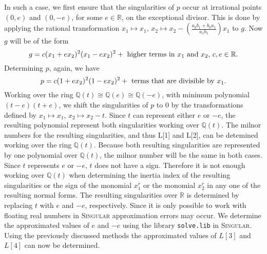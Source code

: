 \documentclass[noend]{amsproc}
\begin{document}
In such a case, we first ensure that the singularities of $p$ occur at
irrational points $(0,e)$ and $(0,-e)$, for some $e\in\mathbb R$, on the
exceptional divisor. This is done by applying the rational transformation
$x_1\mapsto x_1$, $x_2\mapsto x_2-(\frac{a_0b_1+b_0a_1}{a_1b_1})x_1$ to $g$.
Now $g$ will be of the form
\[g=c(x_1+ex_2)^2(x_1-ex_2)^2+\textnormal{ higher terms in $x_1$ and $x_2$,
$c,e\in\mathbb R$}.\]
Determining $p$, again, we have
\[p=c(1+ex_2)^2(1-ex_2)^2+\textnormal{ terms that are divisible by $x_1$.}\]
 Working over the ring $\mathbb Q(t)\cong \mathbb Q(e)\cong \mathbb Q (-e)$,
 with minimum polynomial $(t-e)(t+e)$, we shift the singularities of $p$ to $0$
 by the transformations defined by $x_1\mapsto x_1$, $x_2\mapsto x_2-t$. Since
 $t$ can represent either $e$ or $-e$, the resulting polynomial represent both
 singularities working over $\mathbb Q(t)$. The milnor numbers for the
 resulting singularities, and thus L[1] and L[2], can be detemined working over
 the ring $\mathbb Q(t)$. Because both resulting singularities are represented by
 one polynomial over $\mathbb Q(t)$, the milnor number will be the same in both
 cases. Since $t$ represents $e$ or $-e$, $t$ does not have a sign. Therefore
 it is not enough working over $\mathbb Q(t)$ when determining the inertia
 index of the resulting singularities or the sign of the monomial $x_1^r$ or
 the monomial $x_2^r$ in  any one of the resulting normal forms. The resulting
 singularities over $\mathbb R$ is determined by replacing $t$ with $e$ and
 $-e$, respectively. Since it is only possible to work with floating real
 numbers in \textsc{Singular} approximation errors may occur. We determine the
 approximated values of $e$ and $-e$ using the library {\tt solve.lib}
 \cite{solve.lib} in \textsc{Singular}. Using the previously discussed methods
 the approximated values of $L[3]$ and $L[4]$ can now be determined.
\end{document}
